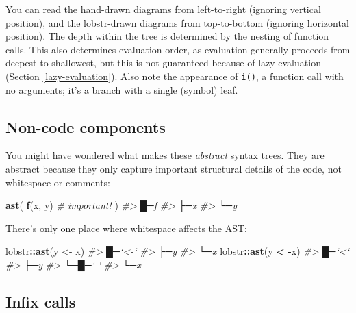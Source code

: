 \documentclass[]{book}
\newenvironment{Shaded}{\begin{snugshade}}{\end{snugshade}}
\newcommand{\CommentTok}[1]{\textcolor[rgb]{0.37,0.37,0.37}{\textit{#1}}}
\newcommand{\KeywordTok}[1]{\textcolor[rgb]{0.27,0.27,0.27}{\textbf{#1}}}
\newcommand{\NormalTok}[1]{#1}
\newcommand{\OperatorTok}[1]{\textcolor[rgb]{0.43,0.43,0.43}{\textbf{#1}}}
\newcommand{\StringTok}[1]{\textcolor[rgb]{0.5,0.5,0.5}{#1}}
\begin{document}
You can read the hand-drawn diagrams from left-to-right (ignoring vertical position), and the lobstr-drawn diagrams from top-to-bottom (ignoring horizontal position). The depth within the tree is determined by the nesting of function calls. This also determines evaluation order, as evaluation generally proceeds from deepest-to-shallowest, but this is not guaranteed because of lazy evaluation (Section \ref{lazy-evaluation}). Also note the appearance of \texttt{i()}, a function call with no arguments; it's a branch with a single (symbol) leaf.

\hypertarget{non-code-components}{%
\subsection{Non-code components}\label{non-code-components}}


You might have wondered what makes these \emph{abstract} syntax trees. They are abstract because they only capture important structural details of the code, not whitespace or comments:

\begin{Shaded}
\begin{Highlighting}[]
\KeywordTok{ast}\NormalTok{(}
  \KeywordTok{f}\NormalTok{(x,  y)  }\CommentTok{# important!}
\NormalTok{)}
\CommentTok{#> █─f }
\CommentTok{#> ├─x }
\CommentTok{#> └─y}
\end{Highlighting}
\end{Shaded}

There's only one place where whitespace affects the AST:

\begin{Shaded}
\begin{Highlighting}[]
\NormalTok{lobstr}\OperatorTok{::}\KeywordTok{ast}\NormalTok{(y <-}\StringTok{ }\NormalTok{x)}
\CommentTok{#> █─`<-` }
\CommentTok{#> ├─y }
\CommentTok{#> └─x}
\NormalTok{lobstr}\OperatorTok{::}\KeywordTok{ast}\NormalTok{(y }\OperatorTok{<}\StringTok{ }\OperatorTok{-}\NormalTok{x)}
\CommentTok{#> █─`<` }
\CommentTok{#> ├─y }
\CommentTok{#> └─█─`-` }
\CommentTok{#>   └─x}
\end{Highlighting}
\end{Shaded}

\hypertarget{infix-calls}{%
\subsection{Infix calls}\label{infix-calls}}
\end{document}
